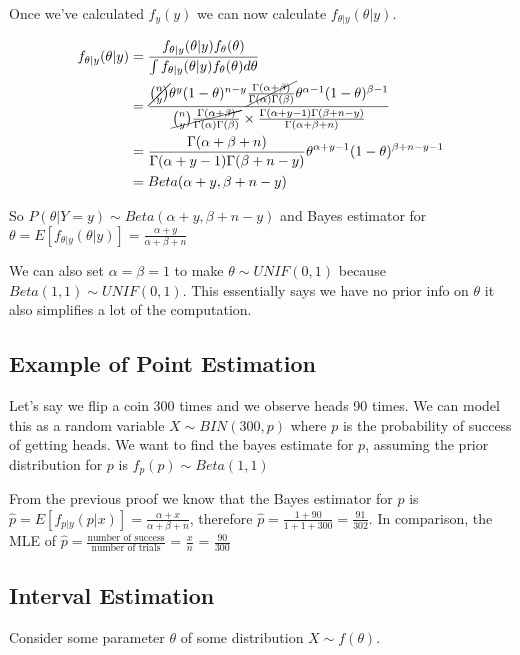 \documentclass{article}
\begin{document}
Once we've calculated $f_{y}(y)$ we can now calculate $f_{\theta|y}(\theta|y)$.

\begin{align*}
f_{\theta|y}(\theta|y) 
&= \frac{f_{\theta|y}(\theta|y)f_{\theta}(\theta)}{\int f_{\theta|y}(\theta|y)f_{\theta}(\theta) d\theta}\\
&= \frac{\cancel{\binom{n}{y}}\theta^{y}(1-\theta)^{n-y} \cancel{\frac{\Gamma(\alpha+\beta)}{\Gamma(\alpha)\Gamma(\beta)}} \theta^{\alpha-1}(1-\theta)^{\beta-1} }  
{ \cancel{\binom{n}{y}\frac{\Gamma(\alpha+\beta)}{\Gamma(\alpha)\Gamma(\beta)}} \times \frac{\Gamma(\alpha + y-1)\Gamma(\beta+n-y)}{\Gamma(\alpha+\beta+n)}}\\
&=\frac{\Gamma(\alpha+\beta+n)}{\Gamma(\alpha + y-1)\Gamma(\beta+n-y)} \theta^{\alpha+y-1} (1-\theta)^{\beta+n-y-1}\\
&=Beta(\alpha+y,\beta+n-y)
\end{align*}

So $P(\theta|Y=y) \sim Beta(\alpha+y,\beta+n-y)$ and Bayes estimator for $\theta = E[f_{\theta|y}(\theta|y)] = \frac{\alpha+y}{\alpha+\beta+n}$\newline

We can also set $\alpha=\beta=1$ to make $\theta \sim UNIF(0,1)$ because $Beta(1,1) \sim UNIF(0,1)$. This essentially says we have no prior info on $\theta$ it also simplifies a lot of the computation.

\newpage
\subsection{Example of Point Estimation}

Let's say we flip a coin 300 times and we observe heads 90 times. We can model this as a random variable $X \sim BIN(300,p)$ where $p$ is the probability of success of getting heads. We want to find the bayes estimate for $p$, assuming the prior distribution for $p$ is $f_{p}(p) \sim Beta(1,1)$\newline

From the previous proof we know that the Bayes estimator for $p$ is $\hat{p} = E[f_{p|y}(p|x)] = \frac{\alpha+x}{\alpha+\beta+n}$, therefore $\hat{p} = \frac{1+90}{1+1+300} = \frac{91}{302}$. In comparison, the MLE of $\hat{p} = \frac{\text{number of success}}{\text{number of trials}}$ = $\frac{x}{n}$ = $\frac{90}{300}$ 


\subsection{Interval Estimation}
Consider some parameter $\theta$ of some distribution $X \sim f(\theta)$.\newline
\end{document}
